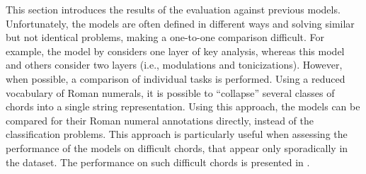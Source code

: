 
This section introduces the results of the evaluation
against previous models. Unfortunately, the models are often
defined in different ways and solving similar but not
identical problems, making a one-to-one comparison
difficult. For example, the model by
\textcite{mcleod2021modular} considers one layer of key
analysis, whereas this model and others consider two layers
(i.e., modulations and tonicizations). However, when
possible, a comparison of individual tasks is performed.
Using a reduced vocabulary of Roman numerals, it is possible
to ``collapse'' several classes of chords into a single
string representation. Using this approach, the models can
be compared for their Roman numeral annotations directly,
instead of the classification problems. This approach is
particularly useful when assessing the performance of the
models on difficult chords, that appear only sporadically in
the dataset. The performance on such difficult chords is
presented in .
